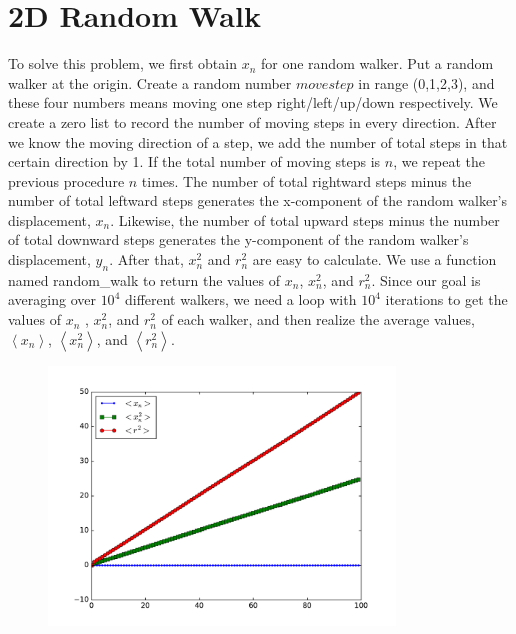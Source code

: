 \documentclass{article}
\begin{document}
\section{2D Random Walk}

To solve this problem, we first obtain $x_{n}$ for one random walker. Put a
random walker at the origin. Create a random number $movestep$ in range
(0,1,2,3), and these four numbers means moving one step right/left/up/down
respectively. We create a zero list to record the number of moving steps in
every direction. After we know the moving direction of a step, we add the
number of total steps in that certain direction by 1. If the total number of
moving steps is $n$, we repeat the previous procedure $n$ times. The number
of total rightward steps minus the number of total leftward steps generates
the x-component of the random walker's displacement, $x_{n}$. Likewise, the
number of total upward steps minus the number of total downward steps
generates the y-component of the random walker's displacement, $y_{n}$.
After that, $x_{n}^{2}$ and $r_{n}^{2}$ are easy to calculate. We use a
function named random\_walk to return the values of $x_{n}$, $x_{n}^{2}$,
and $r_{n}^{2}$. Since our goal is averaging over $10^{4}$ different
walkers, we need a loop with $10^{4}$ iterations to get the values of $x_{n}$%
, $x_{n}^{2}$, and $r_{n}^{2}$ of each walker, and then realize the average
values, $\left\langle x_{n}\right\rangle $, $\left\langle
x_{n}^{2}\right\rangle $, and $\left\langle r_{n}^{2}\right\rangle $. 
\begin{figure}[th]
\centering
\includegraphics[width=0.82\textwidth, clip]{RandomWalk.pdf}
\caption{{}}
\end{figure}

\bigskip
\end{document}
